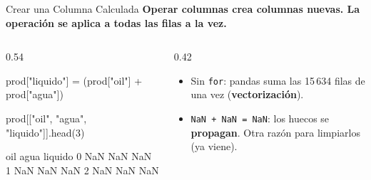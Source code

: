 \documentclass[aspectratio=169, 11pt]{beamer}
\begin{document}
\begin{frame}[fragile,shrink=15]{Crear una Columna Calculada}
  \vspace{-4pt}
  {\small\color{arcaDark}\bfseries
    Operar columnas crea columnas nuevas. La operación se aplica a \textbf{todas las filas} a la vez.}

  \vspace{4pt}
  \begin{columns}[T]
    \begin{column}{0.54\textwidth}
      \begin{pyblock}
prod["liquido"] = (prod["oil"]
                   + prod["agua"])

prod[["oil", "agua", "liquido"]].head(3)
      \end{pyblock}
      \vspace{2pt}
      \begin{outputblock}
    oil   agua  liquido
0   NaN    NaN      NaN
1   NaN    NaN      NaN
2   NaN    NaN      NaN
      \end{outputblock}
    \end{column}

    \begin{column}{0.42\textwidth}
      {\scriptsize\color{textMuted}
      \begin{itemize}\setlength{\itemsep}{5pt}
        \item[{\color{arcaRed}\scriptsize\faArrowRight}]
          Sin \texttt{for}: pandas suma las
          15\,634 filas de una vez
          (\textbf{vectorización}).
        \item[{\color{arcaRed}\scriptsize\faExclamationTriangle}]
          \texttt{NaN + NaN = NaN}: los huecos
          se \textbf{propagan}. Otra razón para
          limpiarlos (ya viene).
      \end{itemize}
      }
    \end{column}
  \end{columns}
\end{frame}
\end{document}
